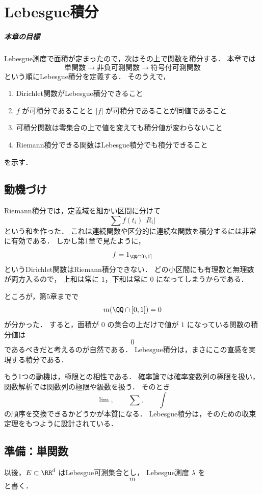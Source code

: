 \chapter{Lebesgue積分}

\paragraph{本章の目標}
Lebesgue測度で面積が定まったので，次はその上で関数を積分する．
本章では
\[
\text{単関数} \to \text{非負可測関数} \to \text{符号付可測関数}
\]
という順にLebesgue積分を定義する．
そのうえで，
\begin{enumerate}
    \item Dirichlet関数がLebesgue積分できること
    \item $f$ が可積分であることと $|f|$ が可積分であることが同値であること
    \item 可積分関数は零集合の上で値を変えても積分値が変わらないこと
    \item Riemann積分できる関数はLebesgue積分でも積分できること
\end{enumerate}
を示す．

\section{動機づけ}

Riemann積分では，定義域を細かい区間に分けて
\[
\sum f(t_i)\,|R_i|
\]
という和を作った．
これは連続関数や区分的に連続な関数を積分するには非常に有効である．
しかし第1章で見たように，
\[
f=1_{\QQ \cap [0,1]}
\]
というDirichlet関数はRiemann積分できない．
どの小区間にも有理数と無理数が両方入るので，
上和は常に $1$，下和は常に $0$ になってしまうからである．

ところが，第5章までで
\[
m(\QQ \cap [0,1])=0
\]
が分かった．
すると，面積が $0$ の集合の上だけで値が $1$ になっている関数の積分値は
\[
0
\]
であるべきだと考えるのが自然である．
Lebesgue積分は，まさにこの直感を実現する積分である．

もう1つの動機は，極限との相性である．
確率論では確率変数列の極限を扱い，
関数解析では関数列の極限や級数を扱う．
そのとき
\[
\lim,\qquad \sum,\qquad \int
\]
の順序を交換できるかどうかが本質になる．
Lebesgue積分は，そのための収束定理をもつように設計されている．

\section{準備：単関数}

以後，$E \subset \RR^d$ はLebesgue可測集合とし，
Lebesgue測度 $\lambda$ を
\[
m
\]
と書く．

